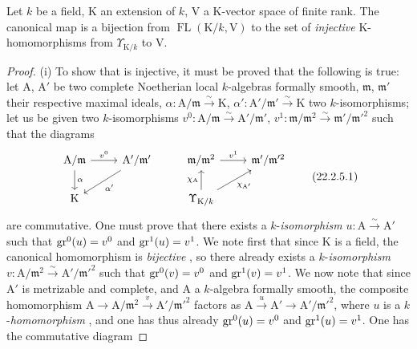 \begin{proposition}[22.2.5]
\label{0.22.2.5}
Let $k$ be a field, $\mathrm{K}$ an extension of $k$, $\mathrm{V}$ a $\mathrm{K}$-vector space of finite rank.
The canonical map  is a bijection from $\operatorname{FL}(\mathrm{K}/k,\mathrm{V})$ to the set of \emph{injective} $\mathrm{K}$-homomorphisms from $\Upsilon_{\mathrm{K}/k}$ to $\mathrm{V}$.
\end{proposition}

\begin{proof}
(i) To show that  is injective, it must be proved that the following is true: let $\mathrm{A}$, $\mathrm{A}'$ be two complete Noetherian local $k$-algebras formally smooth, $\mathfrak{m}$, $\mathfrak{m}'$ their respective maximal ideals, $\alpha:\mathrm{A}/\mathfrak{m}\xrightarrow{\sim}\mathrm{K}$, $\alpha':\mathrm{A}'/\mathfrak{m}'\xrightarrow{\sim}\mathrm{K}$ two $k$-isomorphisms; let us be given two $k$-isomorphisms $v^0:\mathrm{A}/\mathfrak{m}\xrightarrow{\sim}\mathrm{A}'/\mathfrak{m}'$, $v^1:\mathfrak{m}/\mathfrak{m}^2\xrightarrow{\sim}\mathfrak{m}'/\mathfrak{m}'^2$ such that the diagrams
\[
\label{0.22.2.5.1}
  \begin{tikzcd}
    \mathrm{A}/\mathfrak{m} \ar[r,"v^0"] \ar[d,"\alpha"] & \mathrm{A}'/\mathfrak{m}' \ar[dl,"\alpha'"] & \mathfrak{m}/\mathfrak{m}^2 \ar[r,"v^1"] & \mathfrak{m}'/\mathfrak{m}'^2\\
    \mathrm{K} & & \Upsilon_{\mathrm{K}/k} \ar[u,"\chi_\mathrm{A}"] \ar[ur,"\chi_{\mathrm{A}'}"'] &
  \end{tikzcd}
  \tag{22.2.5.1}
\]
are commutative.
One must prove that there exists a $k$-\emph{isomorphism} $u:\mathrm{A}\xrightarrow{\sim}\mathrm{A}'$ such that $\operatorname{gr}^0(u)=v^0$ and $\operatorname{gr}^1(u)=v^1$.
We note first that since $\mathrm{K}$ is a field, the canonical homomorphism  is \emph{bijective} , so there already exists a $k$-\emph{isomorphism} $v:\mathrm{A}/\mathfrak{m}^2\xrightarrow{\sim}\mathrm{A}'/\mathfrak{m}'^2$ such that $\operatorname{gr}^0(v)=v^0$ and $\operatorname{gr}^1(v)=v^1$.
We now note that since $\mathrm{A}'$ is metrizable and complete, and $\mathrm{A}$ a $k$-algebra formally smooth, the composite homomorphism $\mathrm{A}\to\mathrm{A}/\mathfrak{m}^2\xrightarrow{v}\mathrm{A}'/\mathfrak{m}'^2$ factors as $\mathrm{A}\xrightarrow{u}\mathrm{A}'\to\mathrm{A}'/\mathfrak{m}'^2$, where $u$ is a $k$-\emph{homomorphism} , and one has thus already $\operatorname{gr}^0(u)=v^0$ and $\operatorname{gr}^1(u)=v^1$.
One has the commutative diagram

\end{proof}
